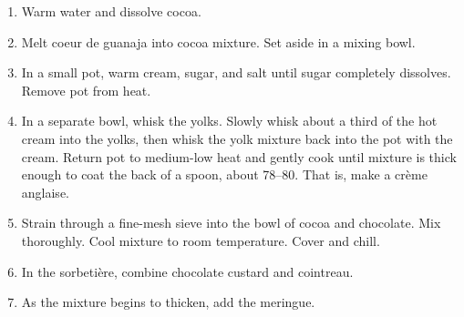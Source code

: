 

\begin{ingredients}
\end{ingredients}


\begin{recipe}
  \begin{enumerate}

  \item Warm water and dissolve cocoa.
    
  \item Melt coeur de guanaja into cocoa mixture.
    Set aside in a mixing bowl.

  \item In a small pot, warm cream, sugar, and salt until sugar
    completely dissolves.  Remove pot from heat.

  \item In a separate bowl, whisk the yolks.  Slowly whisk about a
    third of the hot cream into the yolks, then whisk the yolk mixture
    back into the pot with the cream. Return pot to medium-low heat
    and gently cook until mixture is thick enough to coat the back of
    a spoon, about 78--80\degreeC.  That is, make a crème anglaise.

  \item Strain through a fine-mesh sieve into the bowl of cocoa and
    chocolate.  Mix thoroughly.  Cool mixture to room
    temperature. Cover and chill.
    
  \item In the sorbetière, combine chocolate custard and cointreau.

  \item As the mixture begins to thicken, add the meringue.

  \end{enumerate}
\end{recipe}

